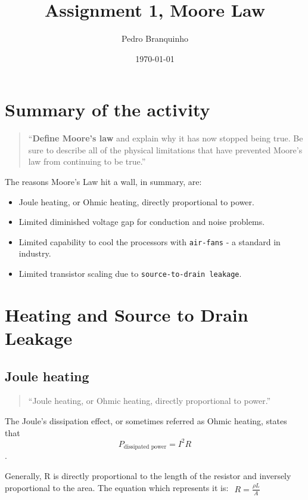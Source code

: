 \documentclass[12pt]{article}
\author{Pedro Branquinho}
\date{\today}
\title{Assignment 1, Moore Law}
\begin{document}
\maketitle

\tableofcontents
\clearpage

\section{Summary of the activity}
\label{sec:summary-activity}

\begin{quote}
  ``\textbf{Define Moore’s law} and explain why it has now stopped being true. Be sure to describe all of the physical limitations that have prevented Moore’s law from continuing to be true.''
\end{quote}

The reasons Moore's Law hit a wall, in summary, are:
\begin{itemize}
  \item Joule heating, or Ohmic heating, directly proportional to power.
  \item Limited diminished voltage gap for conduction and noise problems.
  \item Limited capability to cool the processors with \texttt{air-fans} - a standard in
        industry.
  \item Limited transistor scaling due to \texttt{source-to-drain leakage}.
\end{itemize}

\clearpage
\section{Heating and Source to Drain Leakage}
\label{sec:org97939ab}

\subsection{Joule heating}
\label{sec:org5471b37}
\begin{quote}
  ``Joule heating, or Ohmic heating, directly proportional to power.''
\end{quote}

The Joule's dissipation effect, or sometimes referred as Ohmic heating, states that $$P_{\text{dissipated power}} = I^2R$$.

Generally, R is directly proportional to the length of the resistor and
inversely proportional to the area. The equation which represents it is: \(\begin{array}{l}R= \frac{\rho L}{A}\end{array}\)
\end{document}
